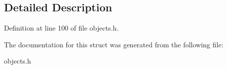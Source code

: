 \subsection{Detailed Description}


Definition at line 100 of file objects.\+h.



The documentation for this struct was generated from the following file\+:\begin{DoxyCompactItemize}
\item 
objects.\+h\end{DoxyCompactItemize}
